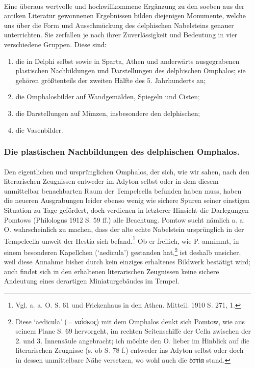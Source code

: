 \documentclass[a4paper, 11pt, oneside]{article}
\begin{document}
\paragraph{}
Eine überaus wertvolle und hochwillkommene Ergänzung zu den soeben aus der antiken Literatur gewonnenen Ergebnissen bilden diejenigen Monumente, welche uns über die Form und Ausschmückung des delphischen Nabelsteins genauer unterrichten. Sie zerfallen je nach ihrer Zuverlässigkeit und Bedeutung in vier verschiedene Gruppen. Diese sind:
\begin{enumerate}
    \item die in Delphi selbst sowie in Sparta, Athen und anderwärts ausgegrabenen plastischen Nachbildungen und Darstellungen des delphischen Omphalos; sie gehören größtenteils der zweiten Hälfte des 5. Jahrhunderts an;
    
    \item die Omphalosbilder auf Wandgemälden, Spiegeln und Cisten;

    \item die Darstellungen auf Münzen, insbesondere den delphischen;

    \item die Vasenbilder.
\end{enumerate}
\subsubsection{Die plastischen Nachbildungen des delphischen Omphalos.}
\paragraph{}
Den eigentlichen und ursprünglichen Omphalos, der sich, wie wir sahen, nach den literarischen Zeugnissen entweder im Adyton selbst oder in dem diesem unmittelbar benachbarten Raum der Tempelcella befunden haben muss, haben die neueren Ausgrabungen leider ebenso wenig wie sichere Spuren seiner einstigen Situation zu Tage gefördert, doch verdienen in letzterer Hinsicht die Darlegungen Pomtows (Philologus 1912 S. 59 ff.) alle Beachtung. Pomtow sucht nämlich a. a. O. wahrscheinlich zu machen, dass der alte echte Nabelstein ursprünglich in der Tempelcella unweit der Hestia sich befand.\footnote{Vgl. a. a. O. S. 61 und Frickenhaus in den Athen. Mitteil. 1910 S. 271, 1.} Ob er freilich, wie P. annimmt, in einem besonderen Kapellchen (`aedicula') gestanden hat,\footnote{Diese `aedicula' (= ναΐσκος) mit dem Omphalos denkt sich Pomtow, wie aus seinem Plane S. 69 hervorgeht, im rechten Seitenschiffe der Cella zwischen der 2. und 3. Innensäule angebracht; ich möchte den O. lieber im Hinblick auf die literarischen Zeugnisse (s. ob S. 78 f.) entweder ins Adyton selbst oder doch in dessen unmittelbare Nähe versetzen, wo wohl auch die ἑστία stand.} ist deshalb unsicher, weil diese Annahme bisher durch kein einziges erhaltenes Bildwerk bestätigt wird; auch findet sich in den erhaltenen literarischen Zeugnissen keine sichere Andeutung eines derartigen Miniaturgebäudes im Tempel.
\end{document}

